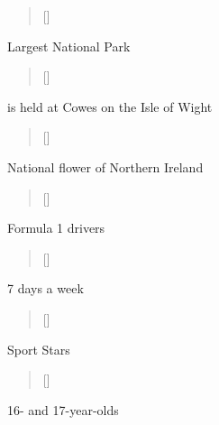 \documentclass[grid,avery5371]{flashcards}
\begin{document}
\begin{flashcard}[]{%
\begin{verse}[\versewidth]
\end{verse}}

Largest National Park

\end{flashcard}

\begin{flashcard}[]{%
\begin{verse}[\versewidth]
\end{verse}}

is held at Cowes on the Isle of Wight

\end{flashcard}


\begin{flashcard}[]{%
\begin{verse}[\versewidth]
\end{verse}}

National flower of Northern Ireland

\end{flashcard}

\begin{flashcard}[]{%
\begin{verse}[\versewidth]
\end{verse}}

Formula 1 drivers

\end{flashcard}

\begin{flashcard}[]{%
\begin{verse}[\versewidth]
\end{verse}}

7 days a week

\end{flashcard}

\begin{flashcard}[]{%
\begin{verse}[\versewidth]
\end{verse}}

Sport Stars

\end{flashcard}

\begin{flashcard}[]{%
\begin{verse}[\versewidth]
\end{verse}}

16- and 17-year-olds 

\end{flashcard}
\end{document}
